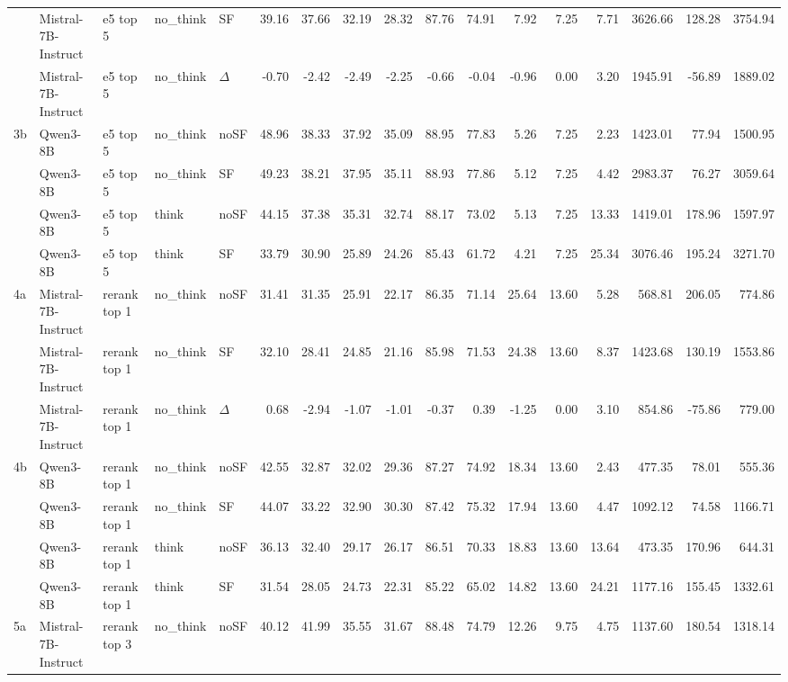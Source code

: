 \begin{landscape}
\begin{footnotesize}
\begin{longtable}{l l l l l r r r r r r r r r r r r}
 & Mistral-7B-Instruct & e5 top 5 & no\_think & SF & 39.16 & 37.66 & 32.19 & 28.32 & 87.76 & 74.91 & 7.92 & 7.25 & 7.71 & 3626.66 & 128.28 & 3754.94 \\
 & Mistral-7B-Instruct & e5 top 5 & no\_think & $\Delta$ & -0.70 & -2.42 & -2.49 & -2.25 & -0.66 & -0.04 & -0.96 & 0.00 & 3.20 & 1945.91 & -56.89 & 1889.02 \\
3b & Qwen3-8B & e5 top 5 & no\_think & noSF & 48.96 & 38.33 & 37.92 & 35.09 & 88.95 & 77.83 & 5.26 & 7.25 & 2.23 & 1423.01 & 77.94 & 1500.95 \\
 & Qwen3-8B & e5 top 5 & no\_think & SF & 49.23 & 38.21 & 37.95 & 35.11 & 88.93 & 77.86 & 5.12 & 7.25 & 4.42 & 2983.37 & 76.27 & 3059.64 \\
 & Qwen3-8B & e5 top 5 & think & noSF & 44.15 & 37.38 & 35.31 & 32.74 & 88.17 & 73.02 & 5.13 & 7.25 & 13.33 & 1419.01 & 178.96 & 1597.97 \\
 & Qwen3-8B & e5 top 5 & think & SF & 33.79 & 30.90 & 25.89 & 24.26 & 85.43 & 61.72 & 4.21 & 7.25 & 25.34 & 3076.46 & 195.24 & 3271.70 \\
\midrule
4a & Mistral-7B-Instruct & rerank top 1 & no\_think & noSF & 31.41 & 31.35 & 25.91 & 22.17 & 86.35 & 71.14 & 25.64 & 13.60 & 5.28 & 568.81 & 206.05 & 774.86 \\
 & Mistral-7B-Instruct & rerank top 1 & no\_think & SF & 32.10 & 28.41 & 24.85 & 21.16 & 85.98 & 71.53 & 24.38 & 13.60 & 8.37 & 1423.68 & 130.19 & 1553.86 \\
 & Mistral-7B-Instruct & rerank top 1 & no\_think & $\Delta$ & 0.68 & -2.94 & -1.07 & -1.01 & -0.37 & 0.39 & -1.25 & 0.00 & 3.10 & 854.86 & -75.86 & 779.00 \\
4b & Qwen3-8B & rerank top 1 & no\_think & noSF & 42.55 & 32.87 & 32.02 & 29.36 & 87.27 & 74.92 & 18.34 & 13.60 & 2.43 & 477.35 & 78.01 & 555.36 \\
 & Qwen3-8B & rerank top 1 & no\_think & SF & 44.07 & 33.22 & 32.90 & 30.30 & 87.42 & 75.32 & 17.94 & 13.60 & 4.47 & 1092.12 & 74.58 & 1166.71 \\
 & Qwen3-8B & rerank top 1 & think & noSF & 36.13 & 32.40 & 29.17 & 26.17 & 86.51 & 70.33 & 18.83 & 13.60 & 13.64 & 473.35 & 170.96 & 644.31 \\
 & Qwen3-8B & rerank top 1 & think & SF & 31.54 & 28.05 & 24.73 & 22.31 & 85.22 & 65.02 & 14.82 & 13.60 & 24.21 & 1177.16 & 155.45 & 1332.61 \\
\midrule
5a & Mistral-7B-Instruct & rerank top 3 & no\_think & noSF & 40.12 & 41.99 & 35.55 & 31.67 & 88.48 & 74.79 & 12.26 & 9.75 & 4.75 & 1137.60 & 180.54 & 1318.14 \\

\end{longtable}
\end{footnotesize}
\end{landscape}
